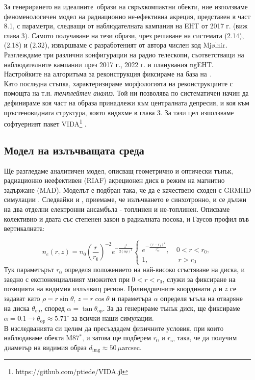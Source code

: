 За генерирането на идеалните$\,$ образи на свръхкомпактни обекти, ние използваме феноменологичен модел на радиационно не-ефективна акреция, представен в част 8.1, с параметри, следващи от наблюдателната кампания на EHT от 2017 г. (виж глава 3). Самото получаване на тези образи, чрез решаване на системата (2.14), (2.18) и (2.32), извършваме с разработеният от автора числен код Mjølnir. \\

Разглеждаме три различни конфигурации на радио телескопи, съответстващи на наблюдателните кампании през 2017 г., 2022 г. и планувания ngEHT.\\

Настройките на алгоритъма за реконструкция фиксираме на база на \cite{EHTIM}.\\

Като последна стъпка, характеризираме морфологията на реконструкциите с помощта на т.н. \emph{темплейтен анализ}. Той ни позволява по систематичен начин да дефинираме коя част на образа принадлежи към централната депресия, и коя към пръстеновидната структура, която видяхме в глава 3. За тази цел използваме софтуерният пакет VIDA\footnote{https://github.com/ptiede/VIDA.jl} \cite{VIDA}.

\subsection{Модел на излъчващата среда}

Ще разгледаме аналитичен модел, описващ геометрично и оптически тънък, радиационно неефективен (RIAF) акреционен диск в режим на магнитно задържане (MAD). Моделът е подбран така, че да е качествено сходен с GRMHD симулации \cite{Yuan2003}. Следвайки \cite{Broderick2021} и \cite{Gold2020}, приемаме, че излъчването е синхотронно, и се дължи на два отделни електронни ансамбъла - топлинен и не-топлинен. Описваме колективно и двата със степенен закон в радиалната посока, и Гаусов профил във вертикалната:

\begin{equation}
	n_e(r,z) = n_0\left(\frac{r}{r_0}\right)^{-2}e^{-\frac{z^2}{2(\alpha\rho)^2}}
	\begin{cases}
		e^{-\frac{(r-r_0)^2}{r^2_{\text{sc}}}},\quad 0 < r < r_0,\\
		1,\,\,\qquad\qquad r>r_0
	\end{cases}
\end{equation}
Тук параметърът $r_0$ определя положението на най-високо сгъстяване на диска, и заедно с експоненциалният множител при $0 < r < r_0$, служи за фиксиране на позицията на видимия излъчващ регион. Цилиндричните координати $\rho$ и $z$ се задават като $\rho = r\sin\theta$, $z = r\cos\theta$ и параметъра $\alpha$ определя ъгъла на отваряне на диска $\theta_{\text{op}}$, според $\alpha = \tan\theta_\text{op}$. За да генерираме тънък диск, ще фиксираме $\alpha = 0.1 \rightarrow \theta_{\text{op}}\approx 5.71^\circ$ за всички наши симулации.\\
В изследванията си целим да пресъздадем физичните условия, при които наблюдаваме обекта M87$^*$, и затова ще подберем $r_0$ и $r_\text{sc}$ така, че да получим диаметър на видимия образ $d_\text{img}\approx 50\, \mu\text{arcsec}$.\\

